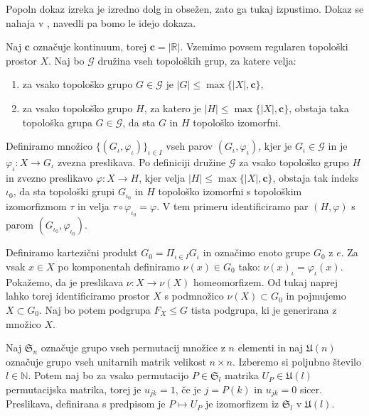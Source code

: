\documentclass[mat1]{fmfdelo}
\newcommand{\R}{\mathbb R}
\newcommand{\N}{\mathbb N}
\begin{document}
\begin{dokaz}
Popoln dokaz izreka je izredno dolg in obsežen, zato ga tukaj izpustimo. Dokaz se nahaja v \cite[(8.8)]{bib:aha1}, navedli pa bomo le idejo dokaza.

Naj $\mathbf{c}$ označuje kontinuum, torej $\mathbf{c} = |\R|$. Vzemimo povsem regularen topološki prostor $X$. Naj bo $\mathcal{G}$ družina vseh topoloških grup, za katere velja:
\begin{enumerate}
\item za vsako topološko grupo $G \in \mathcal{G}$ je $|G| \leq \max\lbrace |X|, \mathbf{c}\rbrace$,
\item za vsako topološko grupo $H$, za katero je $|H| \leq \max\lbrace |X|, \mathbf{c}\rbrace$, obstaja taka topološka grupa $G \in \mathcal{G}$, da sta $G$ in $H$ topološko izomorfni.
\end{enumerate}
Definiramo množico $\lbrace (G_\iota, \varphi_\iota)\rbrace_{\iota \in I}$ vseh parov $(G_\iota, \varphi_\iota)$, kjer je $G_\iota \in \mathcal{G}$ in je $\varphi_\iota\colon X \to G_\iota$ zvezna preslikava. Po definiciji družine $\mathcal{G}$ za vsako topološko grupo $H$ in zvezno preslikavo $\varphi\colon X \to H$, kjer velja $|H| \leq \max\lbrace |X|,  \mathbf{c}\rbrace$, obstaja tak indeks $\iota_0$, da sta topološki grupi $G_{\iota_0}$ in $H$ topološko izomorfni s topološkim izomorfizmom $\tau$ in velja $\tau\circ\varphi_{\iota_0} = \varphi$.
V tem primeru identificiramo par $(H, \varphi)$ s parom $(G_{\iota_0}, \varphi_{\iota_0})$.

Definiramo kartezični produkt $G_0 = \Pi_{\iota \in I}G_\iota$ in označimo enoto grupe $G_0$ z $e$. Za vsak $x \in X$ po komponentah definiramo $\nu(x) \in G_0$ tako: $\nu(x)_\iota = \varphi_\iota(x)$. Pokažemo, da je preslikava $\nu\colon X \to \nu(X)$ homeomorfizem.
Od tukaj naprej lahko torej identificiramo prostor $X$ s podmnožico $\nu(X) \subset G_0$ in pojmujemo $X \subset G_0$.
Naj bo potem podgrupa $F_X \leq G$ tista podgrupa, ki je generirana z množico $X$.

Naj $\mathfrak{S}_n$ označuje grupo vseh permutacij množice z $n$ elementi in naj $\mathfrak{U}(n)$ označuje grupo vseh unitarnih matrik velikost $n\times n$. Izberemo si poljubno število $l \in \N$. Potem naj bo za vsako permutacijo $P \in \mathfrak{S}_l$ matrika $U_P \in \mathfrak{U}(l)$ permutacijska matrika, torej je $u_{jk} = 1$, če je $j = P(k)$ in $u_{jk} = 0$ sicer. Preslikava, definirana s predpisom je $P \mapsto U_P$ je izomorfizem iz $\mathfrak{S}_l$ v $\mathfrak{U}(l)$.


\end{dokaz}
\end{document}
